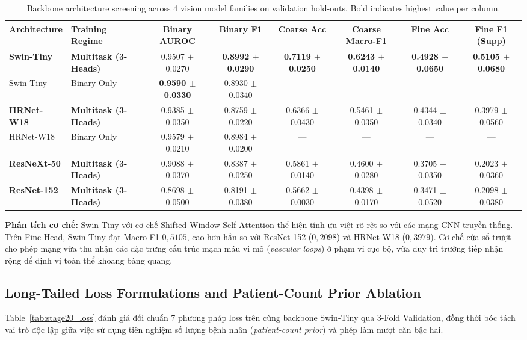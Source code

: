 \documentclass[runningheads]{llncs}
\begin{document}
\begin{table}[t]
\centering
\caption{Backbone architecture screening across 4 vision model families on validation hold-outs. Bold indicates highest value per column.}
\label{tab:stage10_backbone}
\begin{adjustbox}{max width=\textwidth}
\begin{tabular}{llcccccc}
\toprule
\textbf{Architecture} & \textbf{Training Regime} & \textbf{Binary AUROC} & \textbf{Binary F1} & \textbf{Coarse Acc} & \textbf{Coarse Macro-F1} & \textbf{Fine Acc} & \textbf{Fine F1 (Supp)} \\
\midrule
\textbf{Swin-Tiny} & \textbf{Multitask (3-Heads)} & 0.9507 $\pm$ 0.0270 & \textbf{0.8992 $\pm$ 0.0290} & \textbf{0.7119 $\pm$ 0.0250} & \textbf{0.6243 $\pm$ 0.0140} & \textbf{0.4928 $\pm$ 0.0650} & \textbf{0.5105 $\pm$ 0.0680} \\
Swin-Tiny & Binary Only & \textbf{0.9590 $\pm$ 0.0330} & 0.8930 $\pm$ 0.0340 & --- & --- & --- & --- \\
\textbf{HRNet-W18} & \textbf{Multitask (3-Heads)} & 0.9385 $\pm$ 0.0350 & 0.8759 $\pm$ 0.0220 & 0.6366 $\pm$ 0.0430 & 0.5461 $\pm$ 0.0350 & 0.4344 $\pm$ 0.0340 & 0.3979 $\pm$ 0.0560 \\
HRNet-W18 & Binary Only & 0.9579 $\pm$ 0.0210 & 0.8984 $\pm$ 0.0200 & --- & --- & --- & --- \\
\textbf{ResNeXt-50} & \textbf{Multitask (3-Heads)} & 0.9088 $\pm$ 0.0370 & 0.8387 $\pm$ 0.0250 & 0.5861 $\pm$ 0.0140 & 0.4600 $\pm$ 0.0280 & 0.3705 $\pm$ 0.0350 & 0.2023 $\pm$ 0.0360 \\
\textbf{ResNet-152} & \textbf{Multitask (3-Heads)} & 0.8698 $\pm$ 0.0500 & 0.8191 $\pm$ 0.0380 & 0.5662 $\pm$ 0.0030 & 0.4398 $\pm$ 0.0170 & 0.3471 $\pm$ 0.0520 & 0.2098 $\pm$ 0.0380 \\
\bottomrule
\end{tabular}
\end{adjustbox}
\end{table}

\textbf{Phân tích cơ chế:} Swin-Tiny với cơ chế Shifted Window Self-Attention thể hiện tính ưu việt rõ rệt so với các mạng CNN truyền thống. Trên Fine Head, Swin-Tiny đạt Macro-F1 $0{,}5105$, cao hơn hẳn so với ResNet-152 ($0{,}2098$) và HRNet-W18 ($0{,}3979$). Cơ chế cửa sổ trượt cho phép mạng vừa thu nhận các đặc trưng cấu trúc mạch máu vi mô (\textit{vascular loops}) ở phạm vi cục bộ, vừa duy trì trường tiếp nhận rộng để định vị toàn thể khoang bàng quang.

\subsection{Long-Tailed Loss Formulations and Patient-Count Prior Ablation}
Table~\ref{tab:stage20_loss} đánh giá đối chuẩn 7 phương pháp loss trên cùng backbone Swin-Tiny qua 3-Fold Validation, đồng thời bóc tách vai trò độc lập giữa việc sử dụng tiên nghiệm số lượng bệnh nhân (\textit{patient-count prior}) và phép làm mượt căn bậc hai.
\end{document}
